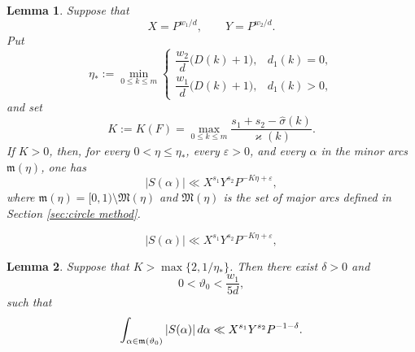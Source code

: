 \documentclass[10pt,a4paper]{amsart}
\newtheorem{lemma}{Lemma}
\def\a{{\alpha}} \def\bfalp{{\boldsymbol \alpha}} \def\atil{{\widetilde \alpha}}
\def\d{{\,{\rm d}}}
\def\eps{\varepsilon}
\def\grm{{\mathfrak m}}\def\grM{{\mathfrak M}}
\begin{document}
\begin{lemma}\label{lemma:hat sigma pointwise minor arc bound}
    Suppose that
    \[
        X=P^{w_1/d},
        \qquad
        Y=P^{w_2/d}.
    \]
    Put
    \[
        \eta_*
        :=\min_{0\leq k\leq m}
        \begin{cases}
        \dfrac{w_2}{d}\bigl(D(k)+1\bigr),&d_1(k)=0,\\[3mm]
        \dfrac{w_1}{d}\bigl(D(k)+1\bigr),&d_1(k)>0,
        \end{cases}
    \]
    and set
    \[
        K:=K(F)=\max_{0\leq k\leq m}
        \frac{s_1+s_2-\widehat{\sigma}(k)}{\varkappa(k)}.
    \]
    If $K>0$, then, for every $0<\eta\leq\eta_*$, every $\eps>0$, and
    every $\a$ in the minor arcs $\grm(\eta)$, one has
    \begin{equation}\label{eqs: pointwise minor arc bound}
        |S(\a)|
        \ll X^{s_1}Y^{s_2}P^{-K\eta+\eps},
    \end{equation}
    where $\grm(\eta)=[0,1)\setminus\grM(\eta)$ and $\grM(\eta)$ is the
    set of major arcs defined in Section \ref{sec:circle method}.
\end{lemma}

    \begin{equation}
        |S(\a)|
        \ll X^{s_1}Y^{s_2}P^{-K\eta+\eps},
    \end{equation}

\begin{lemma}\label{lemma: minor arc bound}
    Suppose that $K > \max\{ 2, 1/\eta_*\}$. Then there exist $\delta>0$ and
    \[
        0<\vartheta_0<\frac{w_1}{5d},
    \]
    such that
    \[\int_{\a \in \grm(\vartheta_0)} |S(\a)| \d \a \ll X^{s_1}Y^{s_2}P^{-1-\delta}.\]
\end{lemma}
\end{document}
